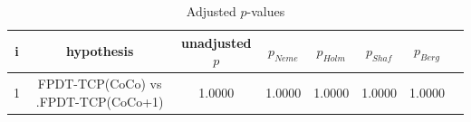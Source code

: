 \documentclass[a4paper,10pt]{article}
\begin{document}
\begin{landscape}
\begin{itemize}
\end{itemize}


\begin{table}[!htp]
\centering\tiny
\caption{Adjusted $p$-values}
\begin{tabular}{cccccccc}
i&hypothesis&unadjusted $p$&$p_{Neme}$&$p_{Holm}$&$p_{Shaf}$&$p_{Berg}$\\
\hline
1&FPDT-TCP(CoCo) vs .FPDT-TCP(CoCo+1)&1.0000&1.0000&1.0000&1.0000&1.0000\\\hline
\end{tabular}
\end{table}

\end{landscape}
\end{document}
